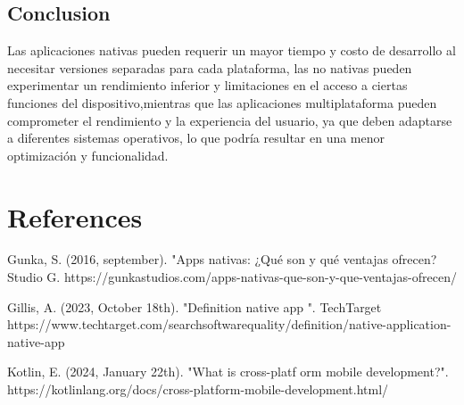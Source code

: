 \documentclass{article}
\begin{document}
\begin{multicols}{2}
		\section{Conclusion}
		Las aplicaciones nativas pueden requerir un mayor tiempo y costo de desarrollo al necesitar versiones separadas para cada plataforma, las no nativas pueden experimentar un rendimiento inferior y limitaciones en el acceso a ciertas funciones del dispositivo,mientras que las aplicaciones multiplataforma pueden comprometer el rendimiento y la experiencia del usuario, ya que deben adaptarse a diferentes sistemas operativos, lo que podría resultar en una menor optimización y funcionalidad.
		
		
	\end{multicols} 
	\section{References}
	Gunka, S. (2016, september). "Apps nativas: ¿Qué son y qué ventajas ofrecen? Studio G. https://gunkastudios.com/apps-nativas-que-son-y-que-ventajas-ofrecen/
	
	
	Gillis, A. (2023, October 18th). "Definition
	native app ". TechTarget
	https://www.techtarget.com/searchsoftwarequality/definition/native-application-native-app
	
	
	Kotlin, E. (2024, January 22th). "What is cross-platf	orm mobile development?". 
	https://kotlinlang.org/docs/cross-platform-mobile-development.html/
	
\end{document}

